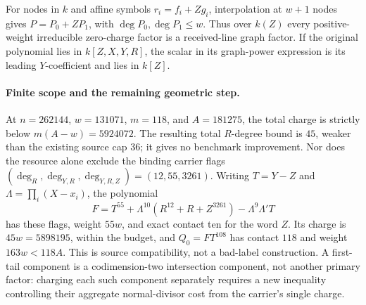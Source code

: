 For nodes in $k$ and affine symbols $r_i=f_i+Zg_i$, interpolation at
$w+1$ nodes gives $P=P_0+ZP_1$, with $\deg P_0,\deg P_1\le w$.
Thus over $k(Z)$ every positive-weight irreducible zero-charge factor
is a received-line graph factor. If the original polynomial lies in
$k[Z,X,Y,R]$, the scalar in its graph-power expression is its leading
$Y$-coefficient and lies in $k[Z]$.

\paragraph{Finite scope and the remaining geometric step.}
At $n=262144$, $w=131071$, $m=118$, and $A=181275$, the total charge
is strictly below $m(A-w)=5924072$. The resulting total $R$-degree
bound is $45$, weaker than the existing source cap $36$; it gives no
benchmark improvement. Nor does the resource alone exclude the
binding carrier flags $(\deg_R,\deg_{Y,R},\deg_{Y,R,Z})=(12,55,3261)$.
Writing $T=Y-Z$ and $\Lambda=\prod_i(X-x_i)$, the polynomial
\[
 F=T^{55}+\Lambda^{10}(R^{12}+R+Z^{3261})
       -\Lambda^9\Lambda'T
\]
has these flags, weight $55w$, and exact contact ten for the word $Z$.
Its charge is $45w=5898195$, within the budget, and
$Q_0=FT^{108}$ has contact $118$ and weight $163w<118A$.
This is source compatibility, not a bad-label construction.
A first-tail component is a codimension-two intersection component,
not another primary factor: charging each such component separately
requires a new inequality controlling their aggregate normal-divisor
cost from the carrier's single charge.
